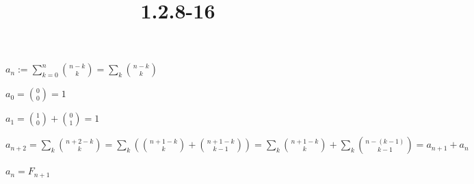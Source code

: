\documentclass{article}
\title{1.2.8-16}
\begin{document}
\maketitle

$a_n := \sum_{k=0}^n \binom{n-k}{k} = \sum_{k} \binom{n-k}{k}$

$a_0 = \binom{0}{0} = 1$

$a_1 = \binom{1}{0} + \binom{0}{1} = 1$

$a_{n+2} = \sum_{k}\binom{n+2-k}{k} = \sum_{k}(\binom{n+1-k}{k} + \binom{n+1-k}{k-1}) = \sum_{k}\binom{n+1-k}{k} + \sum_{k}\binom{n-(k-1)}{k-1} = a_{n+1} + a_n$

$a_n = F_{n+1}$
\end{document}
